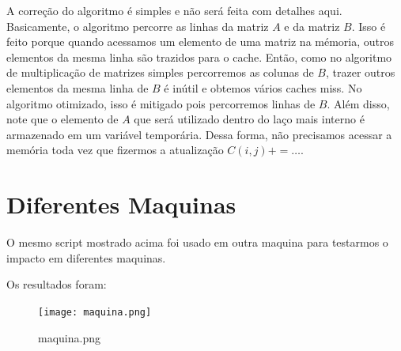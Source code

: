 \documentclass{article}
\begin{document}
A correção do algoritmo é simples e não será feita com detalhes aqui. Basicamente, o algoritmo percorre as linhas da matriz $A$ e da matriz $B$. Isso é feito porque quando acessamos um elemento de uma matriz na mémoria, outros elementos da mesma linha são trazidos para o cache. Então, como no algoritmo de multiplicação de matrizes simples percorremos as colunas de $B$, trazer outros elementos da mesma linha de $B$ é inútil e obtemos vários caches miss. No algoritmo otimizado, isso é mitigado pois percorremos linhas de $B$. Além disso, note que o elemento de $A$ que será utilizado dentro do laço mais interno é armazenado em um variável temporária. Dessa forma, não precisamos acessar a memória toda vez que fizermos a atualização $C(i,j) +=\ldots$.

\section{Diferentes Maquinas}

O mesmo script mostrado acima foi usado em outra maquina para testarmos o impacto em diferentes maquinas.

Os resultados foram:

\begin{figure}[htpb]
  \centering
  \texttt{[image: maquina.png]}
  \caption{maquina.png}
  \label{fig:maquina-png}
\end{figure}
\end{document}
